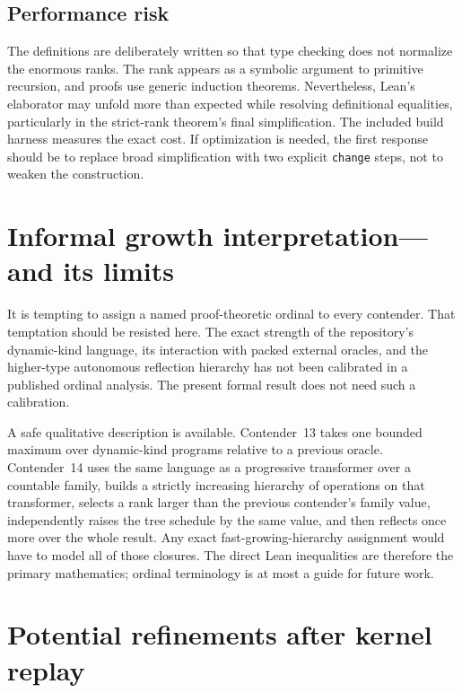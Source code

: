 \documentclass[11pt]{article}
\theoremstyle{definition}
\theoremstyle{remark}
\newcommand{\lean}[1]{\texttt{#1}}
\begin{document}
\subsection{Performance risk}

The definitions are deliberately written so that type checking does not
normalize the enormous ranks.  The rank appears as a symbolic argument to
primitive recursion, and proofs use generic induction theorems.  Nevertheless,
Lean's elaborator may unfold more than expected while resolving definitional
equalities, particularly in the strict-rank theorem's final simplification.
The included build harness measures the exact cost.  If optimization is needed,
the first response should be to replace broad simplification with two explicit
\lean{change} steps, not to weaken the construction.

\section{Informal growth interpretation---and its limits}

It is tempting to assign a named proof-theoretic ordinal to every contender.
That temptation should be resisted here.  The exact strength of the
repository's dynamic-kind language, its interaction with packed external
oracles, and the higher-type autonomous reflection hierarchy has not been
calibrated in a published ordinal analysis.  The present formal result does not
need such a calibration.

A safe qualitative description is available.  Contender~13 takes one bounded
maximum over dynamic-kind programs relative to a previous oracle.  Contender~14
uses the same language as a progressive transformer over a countable family,
builds a strictly increasing hierarchy of operations on that transformer,
selects a rank larger than the previous contender's family value, independently
raises the tree schedule by the same value, and then reflects once more over
the whole result.  Any exact fast-growing-hierarchy assignment would have to
model all of those closures.  The direct Lean inequalities are therefore the
primary mathematics; ordinal terminology is at most a guide for future work.

\section{Potential refinements after kernel replay}
\end{document}

